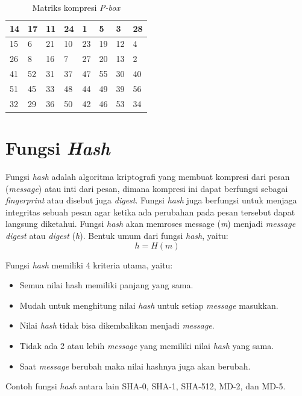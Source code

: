 \begin{table}
	\begin{center}
		\begin{tabular}{|l|l|l|l|l|l|l|l|}
				\hline
				14	&	17	&	11	&	24	&	1	&	5	&	3	&	28	\\ \hline
				15	&	6	&	21	&	10	&	23	&	19	&	12	&	4	\\ \hline
				26	&	8	&	16	&	7	&	27	&	20	&	13	&	2	\\ \hline
				41	&	52	&	31	&	37	&	47	&	55	&	30	&	40	\\ \hline
				51	&	45	&	33	&	48	&	44	&	49	&	39	&	56	\\ \hline
				32	&	29	&	36	&	50	&	42	&	46	&	53	&	34	\\ \hline
		\end{tabular}
	\end{center}
	\label{table:kompresi_p}
	\caption{Matriks kompresi \textit{P-box}}
\end{table}


\section{Fungsi \textit{Hash}}
Fungsi \textit{hash} adalah algoritma kriptografi yang membuat kompresi dari pesan (\textit{message}) atau inti dari pesan, dimana kompresi ini dapat berfungsi sebagai \textit{fingerprint} atau disebut juga \textit{digest}. Fungsi \textit{hash} juga berfungsi untuk menjaga integritas sebuah pesan agar ketika ada perubahan pada pesan tersebut dapat langsung diketahui. Fungsi \textit{hash} akan memroses message (\textit{m}) menjadi \textit{message digest} atau \textit{digest} (\textit{h}). Bentuk umum dari fungsi \textit{hash}, yaitu:
\begin{displaymath}
	h = H(m)
\end{displaymath}

\noindent Fungsi \textit{hash} memiliki 4 kriteria utama, yaitu:
\begin{itemize}
	\item Semua nilai hash memiliki panjang yang sama.
	\item Mudah untuk menghitung nilai \textit{hash} untuk setiap \textit{message} masukkan.
	\item Nilai \textit{hash} tidak bisa dikembalikan menjadi \textit{message}.
	\item Tidak ada 2 atau lebih \textit{message} yang memiliki nilai \textit{hash} yang sama.
	\item Saat \textit{message} berubah maka nilai hashnya juga akan berubah.
\end{itemize}
Contoh fungsi \textit{hash} antara lain SHA-0, SHA-1, SHA-512, MD-2, dan MD-5.

